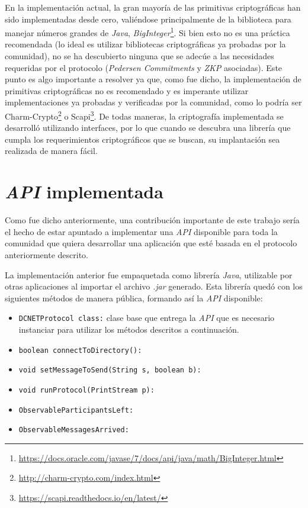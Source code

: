 En la implementación actual, la gran mayoría de las primitivas criptográficas han sido implementadas desde cero, valiéndose principalmente de la biblioteca para manejar números grandes de \emph{Java}, \emph{BigInteger}\footnote{\url{https://docs.oracle.com/javase/7/docs/api/java/math/BigInteger.html}}. Si bien esto no es una práctica recomendada (lo ideal es utilizar bibliotecas criptográficas ya probadas por la comunidad), no se ha descubierto ninguna que se adecúe a las necesidades requeridas por el protocolo (\emph{Pedersen Commitments} y \emph{ZKP} asociadas). Este punto es algo importante a resolver ya que, como fue dicho, la implementación de primitivas criptográficas no es recomendado y es imperante utilizar implementaciones ya probadas y verificadas por la comunidad, como lo podría ser Charm-Crypto\footnote{\url{http://charm-crypto.com/index.html}} o Scapi\footnote{\url{https://scapi.readthedocs.io/en/latest/}}. De todas maneras, la criptografía implementada se desarrolló utilizando interfaces, por lo que cuando se descubra una librería que cumpla los requerimientos criptográficos que se buscan, su implantación sea realizada de manera fácil.

\section{\emph{API} implementada}

Como fue dicho anteriormente, una contribución importante de este trabajo sería el hecho de estar apuntado a implementar una \emph{API} disponible para toda la comunidad que quiera desarrollar una aplicación que esté basada en el protocolo anteriormente descrito. 

La implementación anterior fue empaquetada como librería \emph{Java}, utilizable por otras aplicaciones al importar el archivo \emph{.jar} generado. Esta librería quedó con los siguientes métodos de manera pública, formando así la \emph{API} disponible:

\begin{itemize}
    \item \texttt{DCNETProtocol class:} clase base que entrega la \emph{API} que es necesario instanciar para utilizar los métodos descritos a continuación. 
    \item \texttt{boolean connectToDirectory():}
    \item \texttt{void setMessageToSend(String s, boolean b):}
    \item \texttt{void runProtocol(PrintStream p):}
    \item \texttt{ObservableParticipantsLeft:}
    \item \texttt{ObservableMessagesArrived:}
\end{itemize}

